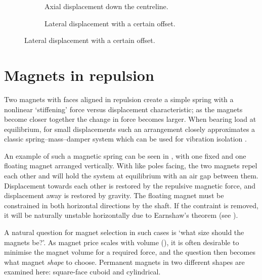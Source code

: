\documentclass[11pt,a4paper]{memoir}
\begin{document}
\begin{figure}
\begin{wide}
\begin{subfigure}[0.45]
\texttt{[image: PhD/Figures/Magnets/gauss-test]}
\caption{Axial displacement down the centreline.}
\end{subfigure}\hfil
\begin{subfigure}
\caption{Lateral displacement with a certain offset.}
\end{subfigure}
\end{wide}

\end{figure}

\section{Magnets in repulsion}

Two magnets with faces aligned in repulsion create a simple spring with a nonlinear `stiffening' force versus displacement characteristic; as the magnets become closer together the change in force becomes larger.
When bearing load at equilibrium, for small displacements such an arrangement closely approximates a classic spring--mass--damper system which can be used for vibration isolation \parencite{puppin2002}.

An example of such a magnetic spring can be seen in , with one fixed and one floating magnet arranged vertically.
With like poles facing, the two magnets repel each other and will hold the system at equilibrium with an air gap between them.
Displacement towards each other is restored by the repulsive magnetic force, and displacement away is restored by gravity.
The floating magnet must be constrained in both horizontal directions by the shaft.
If the contraint is removed, it will be naturally unstable horizontally due to Earnshaw's theorem (see ).

A natural question for magnet selection in such cases is `what size should the magnets be?'.
As magnet price scales with volume (), it is often desirable to minimise the magnet volume for a required force, and the question then becomes what magnet \emph{shape} to choose.
Permanent magnets in two different shapes are examined here: square-face cuboid and cylindrical.
\end{document}

